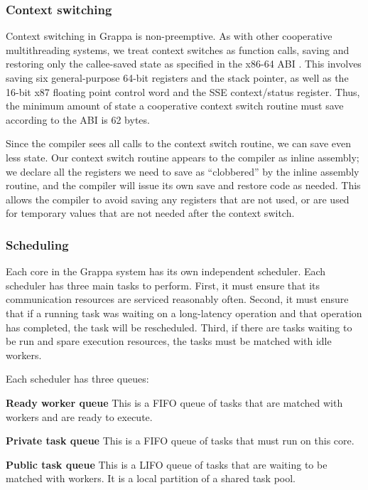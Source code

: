 \subsubsection{Context switching}

Context switching in Grappa is non-preemptive. As with other cooperative
multithreading systems, we treat context switches as function calls,
saving and restoring only the callee-saved state as specified in the
x86-64 ABI \cite{someone}. This involves saving six general-purpose
64-bit registers and the stack pointer, as well as the 16-bit x87
floating point control word and the SSE context/status register. Thus,
the minimum amount of state a cooperative context switch routine must
save according to the ABI is 62 bytes.

Since the compiler sees all calls to the context switch routine, we
can save even less state. Our context switch routine appears to the
compiler as inline assembly; we declare all the registers we need
to save as ``clobbered'' by the inline assembly routine, and the
compiler will issue its own save and restore code as needed. This allows the
compiler to avoid saving any registers that are not used, or are used
for temporary values that are not needed after the context switch.

\subsubsection{Scheduling}

Each core in the Grappa system has its own independent scheduler. Each
scheduler has three main tasks to perform.  First, it must ensure that
its communication resources are serviced reasonably often. Second, it
must ensure that if a running task was waiting on a long-latency
operation and that operation has completed, the task will be
rescheduled. Third, if there are tasks waiting to be run and spare
execution resources, the tasks must be matched with idle workers.

Each scheduler has three queues:
\begin{description}
\item{\bf Ready worker queue} This is a FIFO queue of tasks that are
  matched with workers and are ready to execute.
\item{\bf Private task queue} This is a FIFO queue of tasks that must run on this core.
\item{\bf Public task queue} This is a LIFO queue of tasks that are
  waiting to be matched with workers. It is a local partition of a shared
  task pool.
\end{description}

